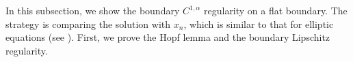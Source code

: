 \documentclass[preprint,12pt]{elsarticle}
\newtheorem{lemma}[theorem]{Lemma}
\theoremstyle{definition}
\theoremstyle{remark}
\newtheorem{remark}[theorem]{Remark}
\numberwithin{equation}{section}
\begin{document}
In this subsection, we show the boundary $C^{1,\alpha}$ regularity on a flat boundary. The strategy is comparing the solution with $x_n$, which is similar to that for elliptic equations (see \cite{MR_Israel}). First, we prove the Hopf lemma and the boundary Lipschitz regularity.


%


\end{document}
